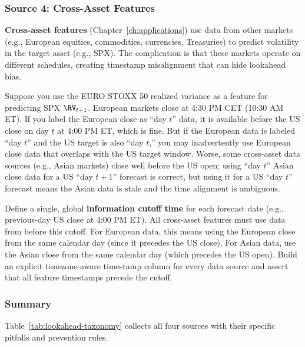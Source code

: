 \subsubsection{Source 4: Cross-Asset Features}

\textbf{Cross-asset features} (Chapter~\ref{ch:applications}) use data from other markets (e.g., European equities, commodities, currencies, Treasuries) to predict volatility in the target asset (e.g., SPX).
The complication is that these markets operate on different schedules, creating timestamp misalignment that can hide lookahead bias.

\begin{warning}
Suppose you use the EURO STOXX 50 realized variance as a feature for predicting SPX $\RV_{t+1}$.
European markets close at 4:30 PM CET (10:30 AM ET).
If you label the European close as ``day $t$'' data, it is available before the US close on day $t$ at 4:00 PM ET, which is fine.
But if the European data is labeled ``day $t$'' and the US target is also ``day $t$,'' you may inadvertently use European close data that overlaps with the US target window.
Worse, some cross-asset data sources (e.g., Asian markets) close well before the US open; using ``day $t$'' Asian close data for a US ``day $t{+}1$'' forecast is correct, but using it for a US ``day $t$'' forecast means the Asian data is stale and the time alignment is ambiguous.
\end{warning}

\begin{keyidea}
Define a single, global \textbf{information cutoff time} for each forecast date (e.g., previous-day US close at 4:00 PM ET).
All cross-asset features must use data from before this cutoff.
For European data, this means using the European close from the same calendar day (since it precedes the US close).
For Asian data, use the Asian close from the same calendar day (which precedes the US open).
Build an explicit timezone-aware timestamp column for every data source and assert that all feature timestamps precede the cutoff.
\end{keyidea}


\subsubsection{Summary}

Table~\ref{tab:lookahead-taxonomy} collects all four sources with their specific pitfalls and prevention rules.

